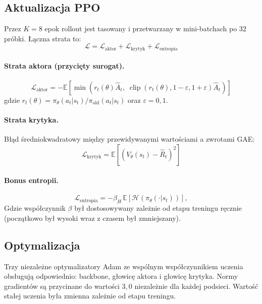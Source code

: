 \documentclass[12pt,a4paper,twocolumn]{article}
\begin{document}
\subsection{Aktualizacja PPO}

Przez $K = 8$ epok rollout jest tasowany i przetwarzany w mini-batchach po $32$ próbki.
Łączna strata to:
\begin{equation}
  \mathcal{L} = \mathcal{L}_\text{aktor} + \mathcal{L}_\text{krytyk} + \mathcal{L}_\text{entropia}
\end{equation}

\paragraph{Strata aktora (przycięty surogat).}
\begin{equation}
  \mathcal{L}_\text{aktor} = -\mathbb{E}\!\left[
    \min\!\left(
      r_t(\theta)\hat{A}_t,\;
      \operatorname{clip}(r_t(\theta), 1{-}\varepsilon, 1{+}\varepsilon)\hat{A}_t
    \right)
  \right]
\end{equation}
gdzie $r_t(\theta) = \pi_\theta(a_t|s_t)/\pi_\text{old}(a_t|s_t)$ oraz $\varepsilon = 0{,}1$.

\paragraph{Strata krytyka.}
Błąd średniokwadratowy między przewidywanymi wartościami a zwrotami GAE:
\begin{equation}
  \mathcal{L}_\text{krytyk} = \mathbb{E}\!\left[(V_\theta(s_t) - \hat{R}_t)^2\right]
\end{equation}

\paragraph{Bonus entropii.}
\begin{equation}
  \mathcal{L}_\text{entropia} = -\beta_H \,\mathbb{E}[\mathcal{H}(\pi_\theta(\cdot|s_t))],
\end{equation}
Gdzie współczynnik $\beta$ był dostosowywany zależnie od etapu treningu ręcznie (początkowo był wysoki wraz z czasem był zmniejszany). 

\subsection{Optymalizacja}

Trzy niezależne optymalizatory Adam ze wspólnym współczynnikiem uczenia obsługują odpowiednio: backbone, głowicę aktora i głowicę krytyka.
Normy gradientów są przycinane do wartości $3{,}0$ niezależnie dla każdej podsieci. Wartość stałej uczenia była zmienna zależnie od etapu treningu.
\end{document}
